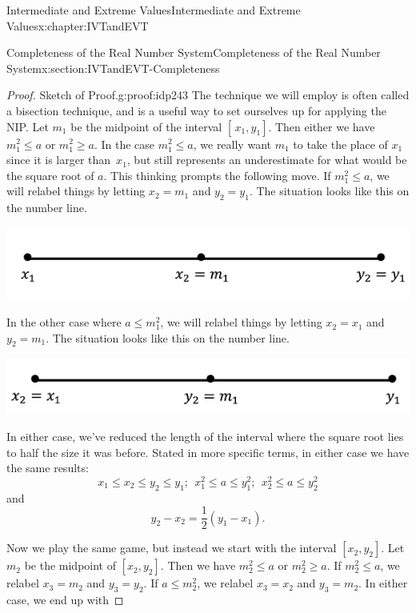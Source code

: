\begin{chapterptx}{Intermediate and Extreme Values}{}{Intermediate and Extreme Values}{}{}{x:chapter:IVTandEVT}
\begin{sectionptx}{Completeness of the Real Number System}{}{Completeness of the Real Number System}{}{}{x:section:IVTandEVT-Completeness}
\begin{proof}{Sketch of Proof.}{g:proof:idp243}
			The technique we will employ is often called a bisection technique, and is a useful way to set ourselves up for applying the NIP. Let \(m_1\) be the midpoint of the interval \([\,x_1,y_1]\). Then either we have \(m_1^2\leq a\) or \(m_1^2\geq a\). In the case \(m_1^2\leq a\), we really want \(m_1\) to take the place of \(x_1\) since it is larger than \(\,x_1\), but still represents an underestimate for what would be the square root of \(a\). This thinking prompts the following move. If \(m_1^2\leq a\), we will relabel things by letting \(x_2=m_1\) and \(y_2=y_1\). The situation looks like this on the number line.%
			\begin{image}{0.22}{0.56}{0.22}%
				\includegraphics[width=\linewidth]{external/images/Ch6fig5.png}
			\end{image}%
			In the other case where \(a\leq m_1^2\), we will relabel things by letting \(x_2=x_1\) and \(y_2=m_1\). The situation looks like this on the number line.%
			\begin{image}{0.22}{0.56}{0.22}%
				\includegraphics[width=\linewidth]{external/images/Ch6fig6.png}
			\end{image}%
			In either case, we've reduced the length of the interval where the square root lies to half the size it was before. Stated in more specific terms, in either case we have the same results:%
			\begin{equation*}
				x_1\leq x_2\leq y_2\leq y_1;\ \  x_1^2\leq a\leq y_1^2;\ \  x_2^2\leq a\leq y_2^2
			\end{equation*}
			and%
			\begin{equation*}
				y_2-x_2=\frac{1}{2}\left(y_1-x_1\right)\text{.}
			\end{equation*}
			\par
			Now we play the same game, but instead we start with the interval \([x_2,y_2]\). Let \(m_2\) be the midpoint of \([x_2,y_2]\). Then we have \(m_2^2\leq a\) or \(m_2^2\geq a\). If \(m_2^2\leq a\), we relabel \(x_3=m_2\) and \(y_3=y_2\). If \(a\leq m_2^2\), we relabel \(x_3=x_2\) and \(y_3=m_2\). In either case, we end up with%

\end{proof}
\end{sectionptx}
\end{chapterptx}

